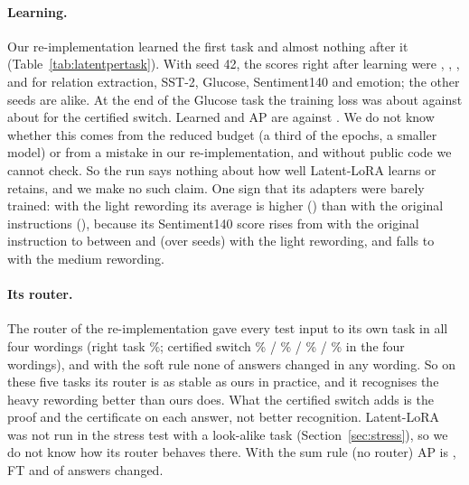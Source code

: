 \begin{table}[h]
  \caption{Original instructions, mean over \LatentSeeds{} seeds: score of each task right after it
  was learned, and the training loss of its last epoch.}
  \label{tab:latentpertask}
  \centering
  \small
  
\end{table}

\paragraph{Learning.} Our re-implementation learned the first task and almost nothing after it
(Table~\ref{tab:latentpertask}). With seed 42, the scores right after learning were
\LatentSeedSoftRelation{}, \LatentSeedSoftSst{}, \LatentSeedSoftGlucose{}, \LatentSeedSoftSenti{} and
\LatentSeedSoftEmotion{} for relation extraction, SST-2, Glucose, Sentiment140 and emotion; the other
seeds are alike. At the end of the Glucose task the training loss was about \LatentLossSoftGlucose{}
against about \LatentLossCertGlucose{} for the certified switch. Learned and AP are \LatentSoftAP{}
against \LatentCertAP{}. We do not know whether this comes from the reduced budget (a third of the
epochs, a smaller model) or from a mistake in our re-implementation, and without public code we cannot
check. So the run says nothing about how well Latent-LoRA learns or retains, and we make no such claim.
One sign that its adapters were barely trained: with the light rewording its average is higher
(\LatentSoftAPLight{}) than with the original instructions (\LatentSoftAP{}), because its Sentiment140
score rises from \LatentSoftSentOriginal{} with the original instruction to between \LatentSoftSentLightLow{} and \LatentSoftSentLightHigh{} (over seeds) with the
light rewording, and falls to \LatentSoftSentMediumMean{} with the medium rewording.

\paragraph{Its router.} The router of the re-implementation gave every test input to its own task in
all four wordings (right task \LatentSoftRight{}\%; certified switch \LatentCertRightOriginal{}\% /
\LatentCertRightLight{}\% / \LatentCertRightMedium{}\% / \LatentCertRightHeavy{}\% in the four wordings), and with
the soft rule none of \LatentCompared{} answers changed in any wording. So on these five tasks its
router is as stable as ours in practice, and it recognises the heavy rewording better than ours does.
What the certified switch adds is the proof and the
certificate on each answer, not better recognition. Latent-LoRA was not run in the stress test with a
look-alike task (Section~\ref{sec:stress}), so we do not know how its router behaves there. With the
sum rule (no router) AP is \LatentSumAP{}, FT \LatentSumFT{} and \LatentSumChanged{} of \LatentCompared{} answers changed.

